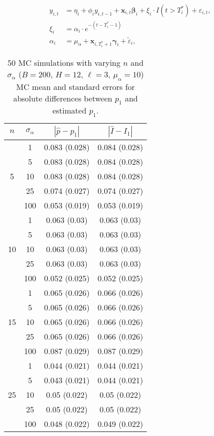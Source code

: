 \documentclass[12pt]{article}
\def\mbf#1{\mathbf{#1}} %
\def\bs#1{\boldsymbol{#1}}
\theoremstyle{definition}
\theoremstyle{definition}
\begin{document}
\begin{align*}
  y_{i,t} &= \eta_i + \phi_i y_{i,t-1} + \mbf{x}_{i,t} \bs{\beta}_i + \xi_i\cdot  I(t > T_i^*) + \varepsilon_{i,t},\\
  \xi_i &= \alpha_i \cdot e^{-(t-T_i^*-1)} \\
  \alpha_i &= \mu_{\alpha} + \mbf{x}_{i,T_i^*+1}\bs{\gamma}_i + \tilde{\varepsilon}_{i},
\end{align*}

\begin{table}[H]
\caption{50 MC simulations  with varying $n$ and $\sigma_{\alpha}$ ($B = 200$, $H = 12$, $\ell = 3$, $\mu_{\alpha}=10$) \\ MC mean and standard errors for absolute differences between $p_1$ and estimated $p_1$.} \vspace{-.5cm} 
\begin{center}
  \begin{tabular}{cccc}
  $n$ & $\sigma_{\alpha}$ & $|\hat{p}-p_1|$ & $|\hat{I}- I_1|$ \\ 
  \hline
\multirow{5}{*}{5} & 1  & 0.083 (0.028) & 0.084 (0.028) \\ 
    & 5  & 0.083 (0.028) & 0.084 (0.028) \\ 
    & 10  & 0.083 (0.028) & 0.084 (0.028) \\ 
    & 25  & 0.074 (0.027) & 0.074 (0.027) \\ 
    & 100  & 0.053 (0.019) & 0.053 (0.019) \\[.15cm] 
    \hline 
   \multirow{5}{*}{10} & 1  & 0.063 (0.03) & 0.063 (0.03) \\ 
   & 5  & 0.063 (0.03) & 0.063 (0.03) \\ 
   & 10  & 0.063 (0.03) & 0.063 (0.03) \\ 
   & 25  & 0.063 (0.03) & 0.063 (0.03) \\ 
    & 100  & 0.052 (0.025) & 0.052 (0.025) \\[.15cm] 
     \hline 
  \multirow{5}{*}{15} & 1  & 0.065 (0.026) & 0.066 (0.026) \\ 
   & 5  & 0.065 (0.026) & 0.066 (0.026) \\ 
    & 10  & 0.065 (0.026) & 0.066 (0.026) \\ 
   & 25  & 0.065 (0.026) & 0.066 (0.026) \\ 
    & 100  & 0.087 (0.029) & 0.087 (0.029) \\[.15cm]  
     \hline 
   \multirow{5}{*}{25}& 1  & 0.044 (0.021) & 0.044 (0.021) \\ 
    & 5  & 0.043 (0.021) & 0.044 (0.021) \\ 
    & 10  & 0.05 (0.022) & 0.05 (0.022) \\ 
    & 25  & 0.05 (0.022) & 0.05 (0.022) \\ 
    & 100  & 0.048 (0.022) & 0.049 (0.022) \\   
  \end{tabular}
\end{center}
\end{table}
\end{document}

